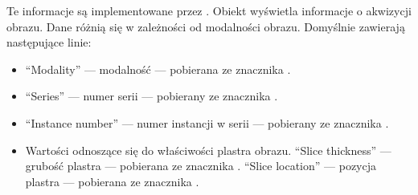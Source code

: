 Te informacje są implementowane przez .
Obiekt wyświetla informacje o akwizycji obrazu.
Dane różnią się w zależności od modalności obrazu.
Domyślnie zawierają następujące linie:
\begin{itemize}
    \item \enquote{Modality} --- modalność --- pobierana ze znacznika .
    \item \enquote{Series} --- numer serii --- pobierany ze znacznika .
    \item \enquote{Instance number} --- numer instancji w serii --- pobierany ze znacznika .
    \item Wartości odnoszące się do właściwości plastra obrazu.
          \enquote{Slice thickness} --- grubość plastra --- pobierana ze znacznika .
          \enquote{Slice location} --- pozycja plastra --- pobierana ze znacznika .
\end{itemize}

